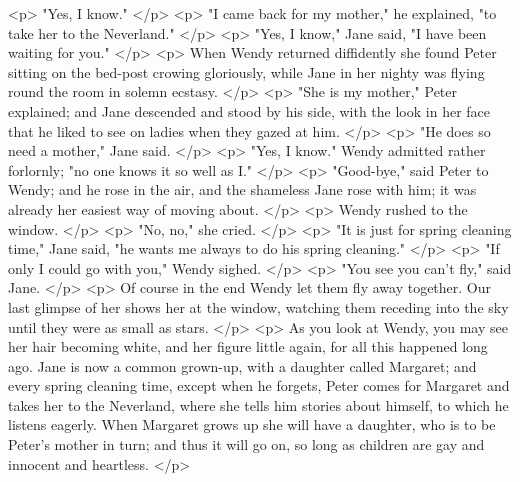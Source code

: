     <p>
      "Yes, I know."
    </p>
    <p>
      "I came back for my mother," he explained, "to take her to the Neverland."
    </p>
    <p>
      "Yes, I know," Jane said, "I have been waiting for you."
    </p>
    <p>
      When Wendy returned diffidently she found Peter sitting on the bed-post
      crowing gloriously, while Jane in her nighty was flying round the room in
      solemn ecstasy.
    </p>
    <p>
      "She is my mother," Peter explained; and Jane descended and stood by his
      side, with the look in her face that he liked to see on ladies when they
      gazed at him.
    </p>
    <p>
      "He does so need a mother," Jane said.
    </p>
    <p>
      "Yes, I know." Wendy admitted rather forlornly; "no one knows it so well
      as I."
    </p>
    <p>
      "Good-bye," said Peter to Wendy; and he rose in the air, and the shameless
      Jane rose with him; it was already her easiest way of moving about.
    </p>
    <p>
      Wendy rushed to the window.
    </p>
    <p>
      "No, no," she cried.
    </p>
    <p>
      "It is just for spring cleaning time," Jane said, "he wants me always to
      do his spring cleaning."
    </p>
    <p>
      "If only I could go with you," Wendy sighed.
    </p>
    <p>
      "You see you can't fly," said Jane.
    </p>
    <p>
      Of course in the end Wendy let them fly away together. Our last glimpse of
      her shows her at the window, watching them receding into the sky until
      they were as small as stars.
    </p>
    <p>
      As you look at Wendy, you may see her hair becoming white, and her figure
      little again, for all this happened long ago. Jane is now a common
      grown-up, with a daughter called Margaret; and every spring cleaning time,
      except when he forgets, Peter comes for Margaret and takes her to the
      Neverland, where she tells him stories about himself, to which he listens
      eagerly. When Margaret grows up she will have a daughter, who is to be
      Peter's mother in turn; and thus it will go on, so long as children are
      gay and innocent and heartless.
    </p>
